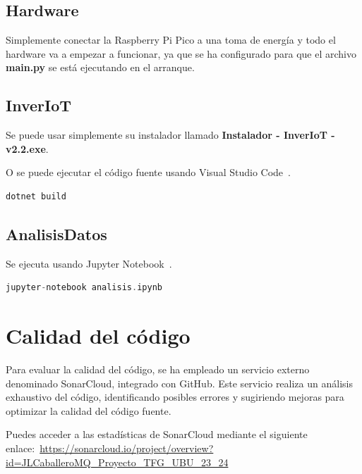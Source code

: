 \subsection{Hardware}
Simplemente conectar la Raspberry Pi Pico a una toma de energía y todo el hardware va a empezar a funcionar, ya que se ha configurado para que el archivo \textbf{main.py} se está ejecutando en el arranque.

\subsection{InverIoT}
Se puede usar simplemente su instalador llamado \textbf{Instalador - InverIoT - v2.2.exe}.

O se puede ejecutar el código fuente usando Visual Studio Code~\cite{misc:vscode}.

\begin{lstlisting}[language=sh, firstnumber=0, basicstyle=\normalsize, caption={Ejecutar proyecto InverIoT.}] 
dotnet build\end{lstlisting}

\subsection{AnalisisDatos}

Se ejecuta usando Jupyter Notebook~\cite{misc:Jupyter_Notebook}.

\begin{lstlisting}[language=cpp, firstnumber=0, basicstyle=\normalsize, caption={Ejecución de \textbf{analisis.ipynb}.}] 
jupyter-notebook analisis.ipynb
\end{lstlisting}

\section{Calidad del código}
Para evaluar la calidad del código, se ha empleado un servicio externo denominado SonarCloud, integrado con GitHub. Este servicio realiza un análisis exhaustivo del código, identificando posibles errores y sugiriendo mejoras para optimizar la calidad del código fuente.

Puedes acceder a las estadísticas de SonarCloud mediante el siguiente enlace:~\url{https://sonarcloud.io/project/overview?id=JLCaballeroMQ_Proyecto_TFG_UBU_23_24}

